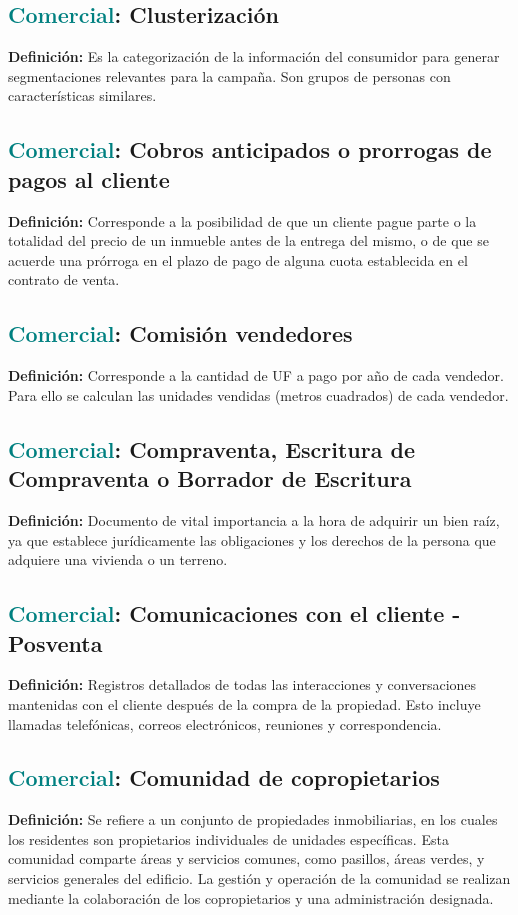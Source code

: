 \documentclass[12pt]{article}
\begin{document}
\subsection{\textcolor{teal}{Comercial}: Clusterización}
\textbf{Definición:} Es la categorización de la información del consumidor para generar segmentaciones relevantes para la campaña. Son grupos de personas con características similares.
\subsection{\textcolor{teal}{Comercial}: Cobros anticipados o prorrogas de pagos al cliente}
\textbf{Definición:} Corresponde a la posibilidad de que un cliente pague parte o la totalidad del precio de un inmueble antes de la entrega del mismo, o de que se acuerde una prórroga en el plazo de pago de alguna cuota establecida en el contrato de venta. 
\subsection{\textcolor{teal}{Comercial}: Comisión vendedores}
\textbf{Definición:} Corresponde a la cantidad de UF a pago por año de cada vendedor. Para ello se calculan las unidades vendidas (metros cuadrados) de cada vendedor.
\subsection{\textcolor{teal}{Comercial}: Compraventa, Escritura de Compraventa o Borrador de Escritura}
\textbf{Definición:} Documento de vital importancia a la hora de adquirir un bien raíz, ya que establece jurídicamente las obligaciones y los derechos de la persona que adquiere una vivienda o un terreno.
\subsection{\textcolor{teal}{Comercial}: Comunicaciones con el cliente - Posventa}
\textbf{Definición:} Registros detallados de todas las interacciones y conversaciones mantenidas con el cliente después de la compra de la propiedad. Esto incluye llamadas telefónicas, correos electrónicos, reuniones y correspondencia.
\subsection{\textcolor{teal}{Comercial}: Comunidad de copropietarios}
\textbf{Definición:} Se refiere a un conjunto de propiedades inmobiliarias, en los cuales los residentes son propietarios individuales de unidades específicas. Esta comunidad comparte áreas y servicios comunes, como pasillos, áreas verdes, y servicios generales del edificio. La gestión y operación de la comunidad se realizan mediante la colaboración de los copropietarios y una administración designada.
\end{document}
